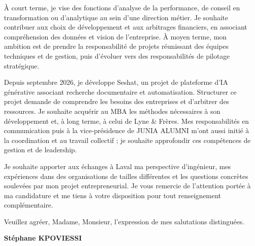 \documentclass[12pt,a4paper]{article}
\begin{document}
\begin{samepage}
À court terme, je vise des fonctions d'analyse de la performance, de conseil en transformation ou d'analytique au sein d'une direction métier. Je souhaite contribuer aux choix de développement et aux arbitrages financiers, en associant compréhension des données et vision de l'entreprise. À moyen terme, mon ambition est de prendre la responsabilité de projets réunissant des équipes techniques et de gestion, puis d'évoluer vers des responsabilités de pilotage stratégique.\par
\end{samepage}

Depuis septembre 2026, je développe Seshat, un projet de plateforme d'IA générative associant recherche documentaire et automatisation. Structurer ce projet demande de comprendre les besoins des entreprises et d'arbitrer des ressources. Je souhaite acquérir au MBA les méthodes nécessaires à son développement et, à long terme, à celui de Lyne \& Frères. Mes responsabilités en communication puis à la vice-présidence de JUNIA ALUMNI m'ont aussi initié à la coordination et au travail collectif ; je souhaite approfondir ces compétences de gestion et de leadership.

Je souhaite apporter aux échanges à Laval ma perspective d'ingénieur, mes expériences dans des organisations de tailles différentes et les questions concrètes soulevées par mon projet entrepreneurial. Je vous remercie de l'attention portée à ma candidature et me tiens à votre disposition pour tout renseignement complémentaire.

Veuillez agréer, Madame, Monsieur, l'expression de mes salutations distinguées.

\vspace{0.5em}
\textbf{Stéphane KPOVIESSI}
\end{document}
